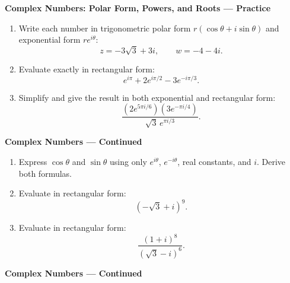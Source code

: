 \documentclass[11pt]{article}
\begin{document}
\newpage
\begin{center}
  {\large\textbf{Complex Numbers: Polar Form, Powers, and Roots --- Practice}}
\end{center}

\begin{enumerate}[leftmargin=*,itemsep=0pt]
  \item Write each number in trigonometric polar form
  $r(\cos\theta+i\sin\theta)$ and exponential form $re^{i\theta}$:
  \[
    z=-3\sqrt3+3i,\qquad w=-4-4i.
  \]
  \par{}

  \item Evaluate exactly in rectangular form:
  \[
    e^{i\pi}+2e^{i\pi/2}-3e^{-i\pi/3}.
  \]
  \par{}

  \item Simplify and give the result in both exponential and rectangular form:
  \[
    \frac{(2e^{5\pi i/6})(3e^{-\pi i/4})}{\sqrt3\,e^{\pi i/3}}.
  \]
  \par{}
\end{enumerate}

\newpage
\begin{center}
  {\large\textbf{Complex Numbers --- Continued}}
\end{center}

\begin{enumerate}[leftmargin=*,itemsep=0pt,resume]
  \item Express $\cos\theta$ and $\sin\theta$ using only $e^{i\theta}$,
  $e^{-i\theta}$, real constants, and $i$. Derive both formulas.
  \par{}

  \item Evaluate in rectangular form:
  \[
    (-\sqrt3+i)^9.
  \]
  \par{}

  \item Evaluate in rectangular form:
  \[
    \frac{(1+i)^8}{(\sqrt3-i)^6}.
  \]
  \par{}
\end{enumerate}

\newpage
\begin{center}
  {\large\textbf{Complex Numbers --- Continued}}
\end{center}
\end{document}
